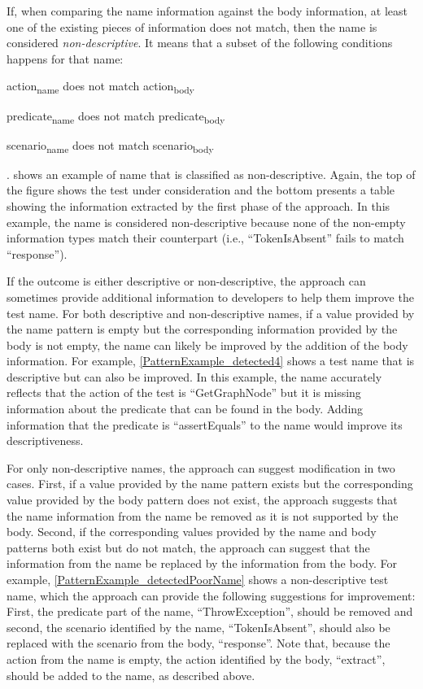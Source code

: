 \documentclass[proposal.tex]{subfiles}
\begin{document}
If, when comparing the name information against the body information, at least one of the existing pieces of information does not match, then the name is considered \emph{non-descriptive}.
%
It means that a subset of the following conditions happens for that name:
\begin{enumerate*}[itemjoin*={{, or }}]
    \item action\textsubscript{name} does not match action\textsubscript{body}
    \item predicate\textsubscript{name} does not match predicate\textsubscript{body}
    \item scenario\textsubscript{name} does not match scenario\textsubscript{body}
\end{enumerate*}.
%
 shows an example of name that is classified as non-descriptive.
%
Again, the top of the figure shows the test under consideration and the bottom presents a table showing the information extracted by the first phase of the approach.
%
In this example, the name is considered non-descriptive because none of the non-empty information types match their counterpart (i.e., \enquote{TokenIsAbsent} fails to match \enquote{response}).


If the outcome is either descriptive or non-descriptive, the approach can sometimes provide additional information to developers to help them improve the test name.
%
For both descriptive and non-descriptive names, if a value provided by the name pattern is empty but the corresponding information provided by the body is not empty, the name can likely be improved by the addition of the body information.
%
For example, \cref{PatternExample_detected4} shows a test name that is descriptive but can also be improved.
%
In this example, the name accurately reflects that the action of the test is \enquote{GetGraphNode} but it is missing information about the predicate that can be found in the body.
%
Adding information that the predicate is \enquote{assertEquals} to the name would improve its descriptiveness.


For only non-descriptive names, the approach can suggest modification in two cases.
%
First, if a value provided by the name pattern exists but the corresponding value provided by the body pattern does not exist, the approach suggests that the name information from the name be removed as it is not supported by the body.
%
Second, if the corresponding values provided by the name and body patterns both exist but do not match, the approach can suggest that the information from the name be replaced by the information from the body.
%
For example, \cref{PatternExample_detectedPoorName} shows a non-descriptive test name, which the approach can provide the following suggestions for improvement:
%
First, the predicate part of the name, \enquote{ThrowException}, should be removed and second, the scenario identified by the name, \enquote{TokenIsAbsent}, should also be replaced with the scenario from the body, \enquote{response}.
%
Note that, because the action from the name is empty, the action identified by the body, \enquote{extract}, should be added to the name, as described above.
\end{document}
